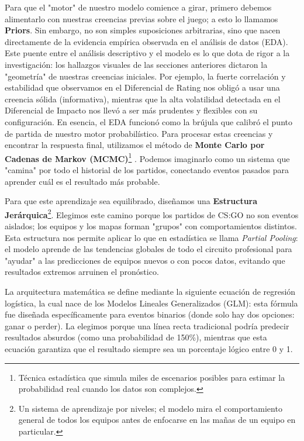 \documentclass[twocolumn,10pt]{article}
\begin{document}
Para que el "motor" de nuestro modelo comience a girar, primero debemos alimentarlo con nuestras creencias previas sobre el juego; a esto lo llamamos \textbf{Priors}. Sin embargo, no son simples suposiciones arbitrarias, sino que nacen directamente de la evidencia empírica observada en el análisis de datos (EDA). Este puente entre el análisis descriptivo y el modelo es lo que dota de rigor a la investigación: los hallazgos visuales de las secciones anteriores dictaron la "geometría" de nuestras creencias iniciales. Por ejemplo, la fuerte correlación y estabilidad que observamos en el Diferencial de Rating nos obligó a usar una creencia sólida (informativa), mientras que la alta volatilidad detectada en el Diferencial de Impacto nos llevó a ser más prudentes y flexibles con su configuración. En esencia, el EDA funcionó como la brújula que calibró el punto de partida de nuestro motor probabilístico. Para procesar estas creencias y encontrar la respuesta final, utilizamos el método de \textbf{Monte Carlo por Cadenas de Markov (MCMC)}\footnote{Técnica estadística que simula miles de escenarios posibles para estimar la probabilidad real cuando los datos son complejos.} \citep{gelman2013bayesian}. Podemos imaginarlo como un sistema que "camina" por todo el historial de los partidos, conectando eventos pasados para aprender cuál es el resultado más probable.

Para que este aprendizaje sea equilibrado, diseñamos una \textbf{Estructura Jerárquica}\footnote{Un sistema de aprendizaje por niveles; el modelo mira el comportamiento general de todos los equipos antes de enfocarse en las mañas de un equipo en particular.}. Elegimos este camino porque los partidos de CS:GO no son eventos aislados; los equipos y los mapas forman "grupos" con comportamientos distintos. Esta estructura nos permite aplicar lo que en estadística se llama \textit{Partial Pooling}: el modelo aprende de las tendencias globales de todo el circuito profesional para "ayudar" a las predicciones de equipos nuevos o con pocos datos, evitando que resultados extremos arruinen el pronóstico.

La arquitectura matemática se define mediante la siguiente ecuación de regresión logística, la cual nace de los Modelos Lineales Generalizados (GLM): esta fórmula fue diseñada específicamente para eventos binarios (donde solo hay dos opciones: ganar o perder). La elegimos porque una línea recta tradicional podría predecir resultados absurdos (como una probabilidad de 150\%), mientras que esta ecuación garantiza que el resultado siempre sea un porcentaje lógico entre 0 y 1.
\end{document}

